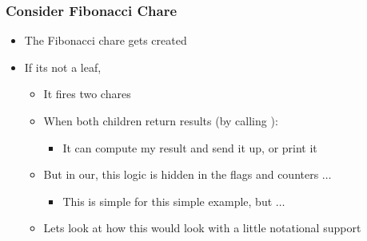 \begin{frame}
  \frametitle{Consider Fibonacci Chare}
  \begin{itemize}
  \item The Fibonacci chare gets created
  \item If its not a leaf,
    \begin{itemize}
    \item It fires two chares
    \item When both children return results (by calling ):
      \begin{itemize}
      \item It can compute my result and send it up, or print it
      \end{itemize}
    \item But in our, this logic is hidden in the flags and counters $\ldots$
      \begin{itemize}
      \item This is simple for this simple example, but $\ldots$
      \end{itemize}
    \item Lets look at how this would look with a little notational support
    \end{itemize}
  \end{itemize}
\end{frame}


